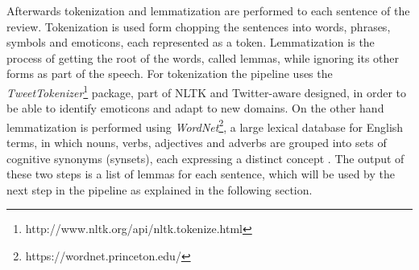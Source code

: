 %
Afterwards tokenization and lemmatization are performed to each sentence of the review. Tokenization is used form chopping the sentences into words, phrases, symbols and emoticons, each represented as a token. Lemmatization is the process of getting the root of the words, called lemmas, while ignoring its other forms as part of the speech. For tokenization the pipeline uses the \textit{TweetTokenizer}\footnote{http://www.nltk.org/api/nltk.tokenize.html} package, part of NLTK and Twitter-aware designed, in order to be able to identify emoticons and adapt to new domains. On the other hand lemmatization is performed using \textit{WordNet}\footnote{https://wordnet.princeton.edu/}, a large lexical database for English terms, in which nouns, verbs, adjectives and adverbs are grouped into sets of cognitive synonyms (synsets), each expressing a distinct concept \cite{miller1995wordnet}. The output of these two steps is a list of lemmas for each sentence, which will be used by the next step in the pipeline as explained in the following section.  
%
